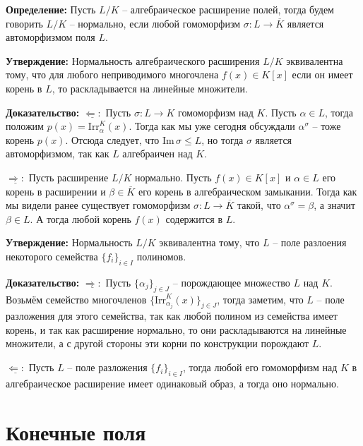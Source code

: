 \documentclass[a4paper, 12pt]{book}
\begin{document}
\textbf{Определение:} Пусть $L/K$ – алгебраическое расширение полей, тогда
будем говорить $L/K$ – нормально, если любой гомоморфизм $\sigma:L\rightarrow
\overline K$ является автоморфизмом поля $L$.

\textbf{Утверждение:} Нормальность алгебраического расширения $L/K$
эквивалентна тому, что для любого неприводимого многочлена $f(x)\in K[x]$ если
он имеет корень в $L$, то раскладывается на линейные множители.

\textbf{Доказательство:} $\underline{\Leftarrow:}$ Пусть $\sigma: L\rightarrow K$
гомоморфизм над $K$. Пусть $\alpha\in L$, тогда положим $p(x)=\text{Irr}_\alpha^
K(x)$. Тогда как мы уже сегодня обсуждали $\alpha^\sigma$ – тоже корень $p(x)$.
Отсюда следует, что $\text{Im}\,\sigma\le L$, но тогда $\sigma$ является
автоморфизмом, так как $L$ алгебраичен над $K$.

$\underline{\Rightarrow:}$ Пусть расширение $L/K$ нормально. Пусть $f(x)\in K[x]$
и $\alpha\in L$ его корень в расширении и $\beta\in\overline K$ его корень в
алгебраическом замыкании. Тогда как мы видели ранее существует гомоморфизм
$\sigma:L\rightarrow\overline K$ такой, что $\alpha^\sigma=\beta$, а значит
$\beta\in L$. А тогда любой корень $f(x)$ содержится в $L$.

\textbf{Утверждение:} Нормальность $L/K$ эквивалентна тому, что $L$ – поле
разлоения некоторого семейства $\{f_i\}_{i\in I}$ полиномов.

\textbf{Доказательство:} $\underline{\Rightarrow:}$ Пусть $\{\alpha_j\}_{j\in J}$ –
порождающее множество $L$ над $K$. Возьмём семейство многочленов $\{\text{Irr}_
{\alpha_j}^K(x)\}_{j\in J}$, тогда заметим, что $L$ – поле разложения для этого
семейства, так как любой полином из семейства имеет корень, и так как расширение
нормально, то они раскладываются на линейные множители, а с другой стороны эти
корни по конструкции порождают $L$.

$\underline{\Leftarrow:}$ Пусть $L$ – поле разложения $\{f_i\}_{i\in I}$, тогда
любой его гомоморфизм над $K$ в алгебраическое расширение имеет одинаковый образ,
а тогда оно нормально.

\section{Конечные поля}
\end{document}
